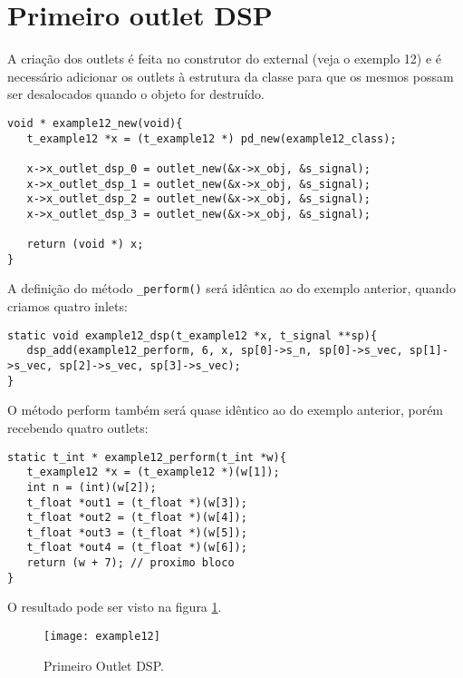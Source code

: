 \section{Primeiro outlet DSP}

A criação dos outlets é feita no construtor do external (veja o exemplo 12) e
é necessário adicionar os outlets à estrutura da classe para que os mesmos
possam ser desalocados quando o objeto for destruído.

\begin{lstlisting}[caption=Criação de outlets DSP]
void * example12_new(void){
   t_example12 *x = (t_example12 *) pd_new(example12_class);

   x->x_outlet_dsp_0 = outlet_new(&x->x_obj, &s_signal);
   x->x_outlet_dsp_1 = outlet_new(&x->x_obj, &s_signal);
   x->x_outlet_dsp_2 = outlet_new(&x->x_obj, &s_signal);
   x->x_outlet_dsp_3 = outlet_new(&x->x_obj, &s_signal);

   return (void *) x;
}
\end{lstlisting}

A definição do método \texttt{\_perform()} será idêntica ao do exemplo
anterior, quando criamos quatro inlets:

\begin{lstlisting}[caption=Método DSP para outlets]
static void example12_dsp(t_example12 *x, t_signal **sp){
   dsp_add(example12_perform, 6, x, sp[0]->s_n, sp[0]->s_vec, sp[1]->s_vec, sp[2]->s_vec, sp[3]->s_vec);
}
\end{lstlisting}

O método perform também será quase idêntico ao do exemplo anterior, porém
recebendo quatro outlets:

\begin{lstlisting}[caption=Método Perform para outlets]
static t_int * example12_perform(t_int *w){
   t_example12 *x = (t_example12 *)(w[1]);
   int n = (int)(w[2]);
   t_float *out1 = (t_float *)(w[3]);
   t_float *out2 = (t_float *)(w[4]);
   t_float *out3 = (t_float *)(w[5]);
   t_float *out4 = (t_float *)(w[6]);
   return (w + 7); // proximo bloco
}
\end{lstlisting}

O resultado pode ser visto na figura \ref{fig:primeiro-outlet}.

\begin{figure}[h!]
\centering
\texttt{[image: example12]}
\caption{Primeiro Outlet DSP.}
\label{fig:primeiro-outlet}
\end{figure}


